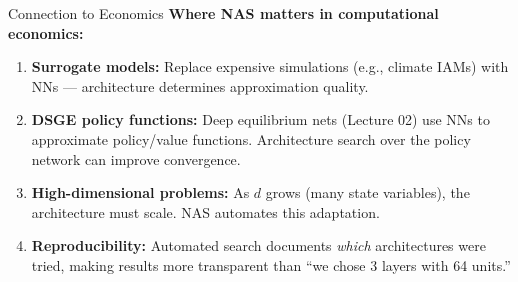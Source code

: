 \documentclass[aspectratio=169,11pt]{beamer}
\newcommand{\emphc}[1]{\textcolor{harvardcrimson}{#1}}
\begin{document}
\begin{frame}{Connection to Economics}
\textbf{Where NAS matters in computational economics:}

\vspace{0.3cm}
\begin{enumerate}
    \item \textbf{Surrogate models:} Replace expensive simulations (e.g., climate IAMs) with NNs --- architecture determines approximation quality.

    \vspace{0.2cm}
    \item \textbf{DSGE policy functions:} Deep equilibrium nets (Lecture 02) use NNs to approximate policy/value functions. \emphc{Architecture search over the policy network} can improve convergence.

    \vspace{0.2cm}
    \item \textbf{High-dimensional problems:} As $d$ grows (many state variables), the architecture must scale. NAS automates this adaptation.

    \vspace{0.2cm}
    \item \textbf{Reproducibility:} Automated search documents \emph{which} architectures were tried, making results more transparent than ``we chose 3 layers with 64 units.''
\end{enumerate}
\end{frame}
\end{document}
